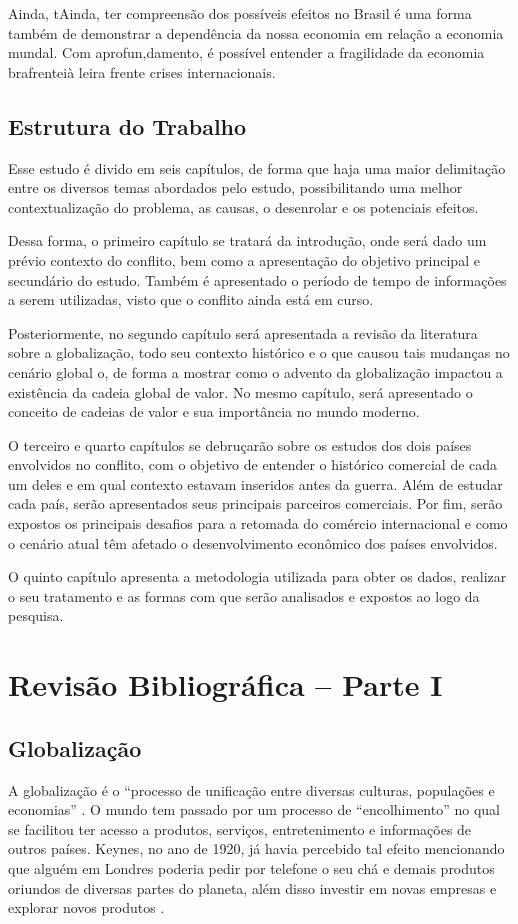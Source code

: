 \documentclass[12pt]{article}
\begin{document}
Ainda, tAinda, ter compreensão dos possíveis efeitos no Brasil é uma forma também de demonstrar a dependência da nossa economia em relação a economia mundal. Com aprofun,damento, é possível entender a fragilidade da economia brafrenteià leira frente  crises internacionais.

\subsection{Estrutura do Trabalho}
Esse estudo é divido em seis capítulos, de forma que haja uma maior delimitação entre os diversos temas abordados pelo estudo, possibilitando uma melhor contextualização do problema, as causas, o desenrolar e os potenciais efeitos. 

Dessa forma, o primeiro capítulo se tratará da introdução, onde será dado um prévio contexto do conflito, bem como a apresentação do objetivo principal e secundário do estudo. Também é apresentado o período de tempo de informações a serem utilizadas, visto que o conflito ainda está em curso.

Posteriormente, no segundo capítulo será apresentada a revisão da literatura sobre a globalização, todo seu contexto histórico e o que causou tais mudanças no cenário global o, de forma a mostrar como o advento da globalização impactou a existência da cadeia global de valor. No mesmo capítulo, será apresentado o conceito de cadeias de valor e sua importância no mundo moderno.

O terceiro e quarto capítulos se debruçarão sobre os estudos dos dois países envolvidos no conflito, com o objetivo de entender o histórico comercial de cada um deles e em qual contexto estavam inseridos antes da guerra. Além de estudar cada país, serão apresentados seus principais parceiros comerciais. Por fim, serão expostos os principais desafios para a retomada do comércio internacional e como o cenário atual têm afetado o desenvolvimento econômico dos países envolvidos.

O quinto capítulo apresenta a metodologia utilizada para obter os dados, realizar o seu tratamento e as formas com que serão analisados e expostos ao logo da pesquisa. 
\pagebreak

\section{Revisão Bibliográfica – Parte I}

\subsection{Globalização}
A globalização é o “processo de unificação entre diversas culturas, populações e economias” \cite{globalization18}. O mundo tem passado por um processo de “encolhimento” no qual se facilitou ter acesso a produtos, serviços, entretenimento e informações de outros países. Keynes, no ano de 1920, já havia percebido tal efeito mencionando que alguém em Londres poderia pedir por telefone o seu chá e demais produtos oriundos de diversas partes do planeta, além disso investir em novas empresas e explorar novos produtos \cite{keynes1920}.
\end{document}
